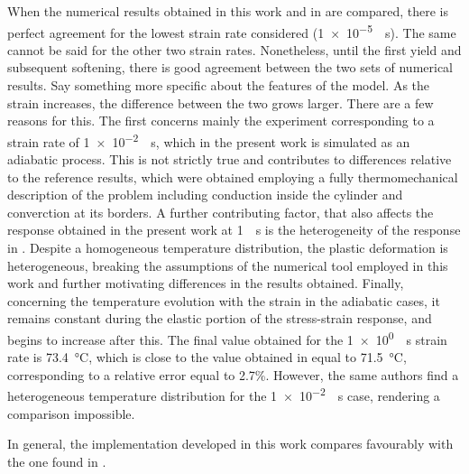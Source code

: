 When the numerical results obtained in this work and in \cite{haoUnifiedAmorphousCrystalline2022} are compared, there is perfect agreement for the lowest strain rate considered (\SI{1e-5}{\per\second}).
The same cannot be said for the other two strain rates.
Nonetheless, until the first yield and subsequent softening, there is good agreement between the two sets of numerical results.
\colorbox{BrickRed}{Say something more specific about the features of the model.}
As the strain increases, the difference between the two grows larger.
There are a few reasons for this.
The first concerns mainly the experiment corresponding to a strain rate of \SI{1e-2}{\per\second}, which in the present work is simulated as an adiabatic process.
This is not strictly true and contributes to differences relative to the reference results, which were obtained employing a fully thermomechanical description of the problem including conduction inside the cylinder and converction at its borders.
A further contributing factor, that also affects the response obtained in the present work at \SI{1}{\per\second} is the heterogeneity of the response in \cite{haoUnifiedAmorphousCrystalline2022}.
Despite a homogeneous temperature distribution, the plastic deformation is heterogeneous, breaking the assumptions of the numerical tool employed in this work and further motivating differences in the results obtained.
Finally, concerning the temperature evolution with the strain in the adiabatic cases, it remains constant during the elastic portion of the stress-strain response, and begins to increase after this.
The final value obtained for the \SI{1e0}{\per\second} strain rate is \SI{73.4}{\celsius}, which is close to the value obtained in \cite{haoUnifiedAmorphousCrystalline2022} equal to \SI{71.5}{\celsius}, corresponding to a relative error equal to 2.7\%.
However, the same authors find a heterogeneous temperature distribution for the \SI{1e-2}{\per\second} case, rendering a comparison impossible.

In general, the implementation developed in this work compares favourably with the one found in \cite{haoUnifiedAmorphousCrystalline2022}.

\subsection{\cite{abdul-hameedTwophaseHyperelasticviscoplasticConstitutive2014}}

